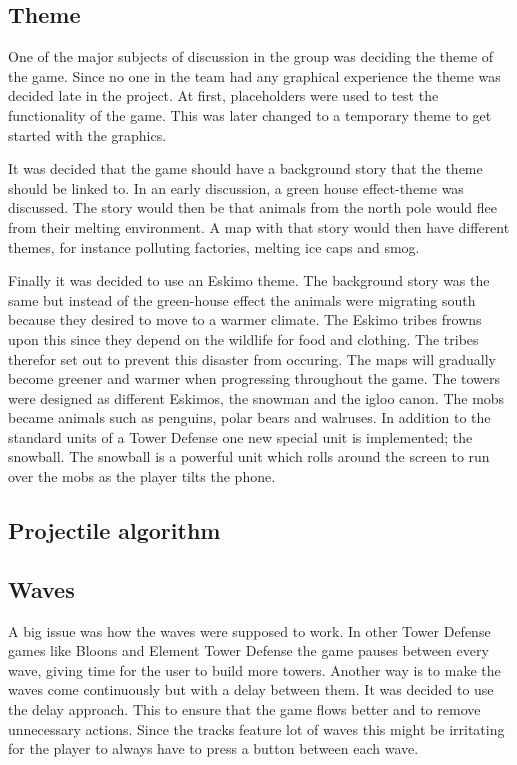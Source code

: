 \subsection{Theme}

One of the major subjects of discussion in the group was deciding the theme of the game. Since no one in the team had any graphical experience the theme was decided late in the project. At first, placeholders were used to test the functionality of the game. This was later changed to a temporary theme to get started with the graphics. 

It was decided that the game should have a background story that the theme should be linked to. In an early discussion, a green house effect-theme was discussed. The story would then be that animals from the north pole would flee from their melting environment. A map with that story would then have different themes, for instance polluting factories, melting ice caps and smog.

Finally it was decided to use an Eskimo theme. The background story was the same but instead of the green-house effect the animals were migrating south because they desired to move to a warmer climate. The Eskimo tribes frowns upon this since they depend on the wildlife for food and clothing. The tribes therefor set out to prevent this disaster from occuring. The maps will gradually become greener and warmer when progressing throughout the game. The towers were designed as different Eskimos, the snowman and the igloo canon. The mobs became animals such as penguins, polar bears and walruses. In addition to the standard units of a Tower Defense one new special unit is implemented; the snowball. The snowball is a powerful unit which rolls around the screen to run over the mobs as the player tilts the phone.
\subsection{Projectile algorithm}


\subsection{Waves}

A big issue was how the waves were supposed to work. In other Tower Defense games like Bloons and Element Tower Defense the game pauses between every wave, giving time for the user to build more towers. Another way is to make the waves come continuously but with a delay between them. It was decided to use the delay approach. This to ensure that the game flows better and to remove unnecessary actions. Since the tracks feature lot of waves this might be irritating for the player to always have to press a button between each wave.

